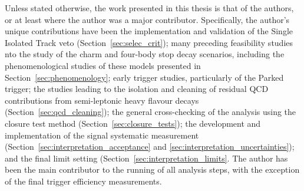 

\begin{contribution}
\label{sec:contribution}

Unless stated otherwise, the work presented in this thesis is that of the authors, 
or at least where the author was a major contributor. Specifically, the author's
unique contributions have been the implementation and validation of the Single
Isolated Track veto (Section~\ref{sec:selec_crit}); many preceding feasibility studies 
nto the study of the charm
and four-body stop decay scenarios, including the phenomenological studies of these
models presented in Section~\ref{sec:phenomenology}; early trigger studies, particularly
of the Parked trigger; the studies leading to the
isolation and cleaning of residual QCD contributions from semi-leptonic heavy flavour
decays (Section~\ref{sec:qcd_cleaning}); the general cross-checking of the analysis
using the closure test method (Section~\ref{sec:closure_tests}); the
development and implementation of the signal systematic measurement (Section~\ref{sec:interpretation_acceptance} and
\ref{sec:interpretation_uncertainties}); and the final
limit setting (Section~\ref{sec:interpretation_limits}. The author has been the
main contributor to the running of all analysis steps, with the exception of the
final trigger efficiency measurements.

\end{contribution}